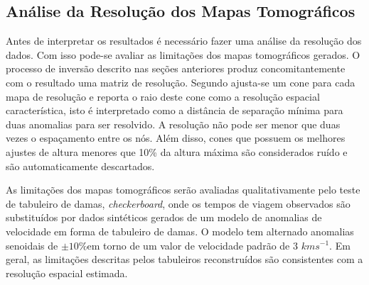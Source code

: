 \subsection{Análise da Resolução dos Mapas Tomográficos}

Antes de interpretar os resultados é necessário fazer uma análise da resolução dos dados. Com isso pode-se avaliar as limitações dos mapas tomográficos gerados. O processo de inversão descrito nas seções anteriores produz concomitantemente com o resultado uma matriz de resolução. Segundo \cite{barmin_fast_2001} ajusta-se um cone para cada mapa de resolução e reporta o raio deste cone como a resolução espacial característica, isto é interpretado como a distância de separação mínima para duas anomalias para ser resolvido. A resolução não pode ser menor que duas vezes o espaçamento entre os nós. Além disso, cones que possuem os melhores ajustes de altura menores que 10\% da altura máxima são considerados ruído e são automaticamente descartados.  

As limitações dos mapas tomográficos serão avaliadas qualitativamente pelo teste de tabuleiro de damas, \textit{checkerboard}, onde os tempos de viagem observados são substituídos por dados sintéticos gerados de um modelo de anomalias  de velocidade em forma de tabuleiro de damas. O modelo tem alternado anomalias senoidais de $\pm 10\% $em torno de um valor de velocidade padrão de 3 $kms^{-1}$. Em geral, as limitações descritas pelos tabuleiros reconstruídos são consistentes com a resolução espacial estimada.